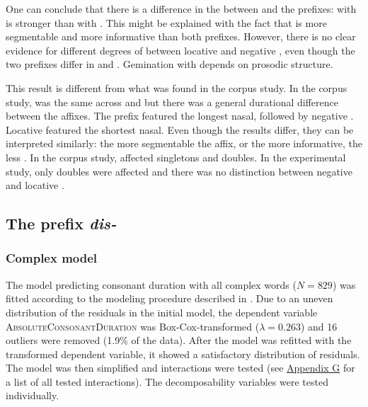 One can conclude that there is a difference in the  between  and the prefixes:  with  is stronger than  with . This might be explained with the fact that  is more segmentable and more informative than both prefixes. However, there is no clear evidence for different degrees of  between  locative  and negative , even though the two prefixes differ in  and . Gemination with  depends on prosodic structure.

 This result is different from what was found in the corpus study. In the corpus study,  was the same across  and  but there was a general durational difference between the affixes. The prefix  featured the longest nasal, followed by negative . Locative  featured the shortest nasal. 
Even though the results differ, they can be interpreted similarly: the more segmentable the affix, or the more informative, the less . In the corpus study,   affected singletons and doubles. In the experimental study, only doubles were affected and there was no distinction between negative and locative .






\subsection{The prefix \textit{dis-} }


\subsubsection{Complex model}

The model predicting consonant duration with all complex words ($N=829$) was fitted according to the modeling procedure described in . Due to an uneven distribution of the residuals in the initial model, the dependent variable \textsc{AbsoluteConsonantDuration} was Box-Cox-transformed ($\lambda = 0.263$) and 16 outliers were removed (1.9\% of the data). After the model was refitted with the transformed dependent variable, it showed a satisfactory distribution of residuals. The model was then simplified and interactions were tested (see \hyperref[Appendix G Summaries of tested interactions in experimental study]{Appendix G} for a list of all tested interactions). The decomposability variables were tested individually.

